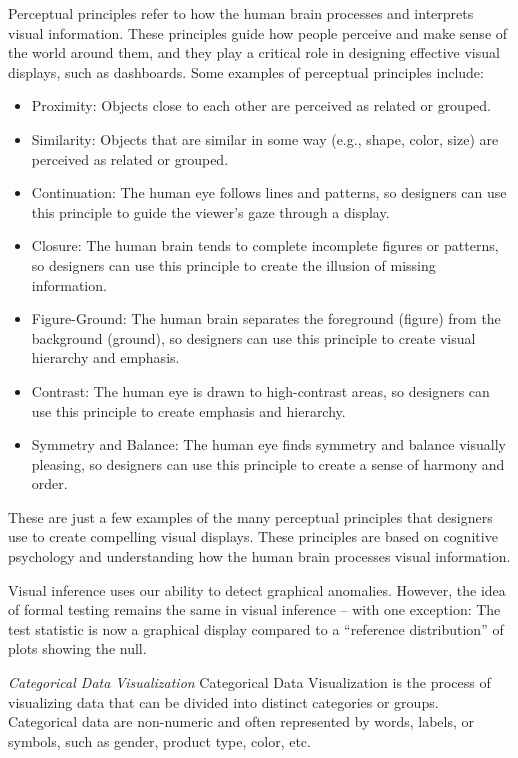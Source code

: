 \documentclass[print]{nuthesis}
\providecommand{\tightlist}{%
  \setlength{\itemsep}{0pt}\setlength{\parskip}{0pt}}
\begin{document}
Perceptual principles refer to how the human brain processes and interprets visual information. These principles guide how people perceive and make sense of the world around them, and they play a critical role in designing effective visual displays, such as dashboards. Some examples of perceptual principles include:

\begin{itemize}
\tightlist
\item
  Proximity: Objects close to each other are perceived as related or grouped.
\item
  Similarity: Objects that are similar in some way (e.g., shape, color, size) are perceived as related or grouped.
\item
  Continuation: The human eye follows lines and patterns, so designers can use this principle to guide the viewer's gaze through a display.
\item
  Closure: The human brain tends to complete incomplete figures or patterns, so designers can use this principle to create the illusion of missing information.
\item
  Figure-Ground: The human brain separates the foreground (figure) from the background (ground), so designers can use this principle to create visual hierarchy and emphasis.
\item
  Contrast: The human eye is drawn to high-contrast areas, so designers can use this principle to create emphasis and hierarchy.
\item
  Symmetry and Balance: The human eye finds symmetry and balance visually pleasing, so designers can use this principle to create a sense of harmony and order.
\end{itemize}

These are just a few examples of the many perceptual principles that designers use to create compelling visual displays. These principles are based on cognitive psychology and understanding how the human brain processes visual information.

Visual inference uses our ability to detect graphical anomalies. However, the idea of formal testing remains the same in visual inference -- with one exception: The test statistic is now a graphical display compared to a ``reference distribution'' of plots showing the null.

\emph{Categorical Data Visualization}
Categorical Data Visualization is the process of visualizing data that can be divided into distinct categories or groups. Categorical data are non-numeric and often represented by words, labels, or symbols, such as gender, product type, color, etc.
\end{document}
